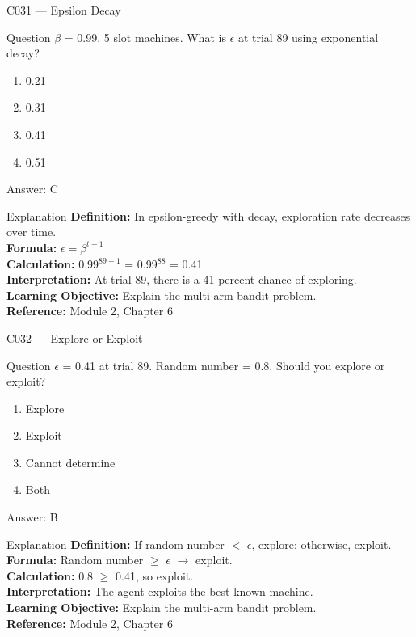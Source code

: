 \documentclass[aspectratio=169,8pt]{beamer}
\begin{document}
	\begin{frame}{C031 --- Epsilon Decay}
		\begin{block}{Question}
			$\beta$ = 0.99, 5 slot machines. What is $\epsilon$ at trial 89 using exponential decay?
			\begin{enumerate}
				\item 0.21
				\item 0.31
				\item 0.41
				\item 0.51
			\end{enumerate}
		\end{block}
		\begin{exampleblock}{Answer: C}\end{exampleblock}
		\begin{block}{Explanation}
			\textbf{Definition:} In epsilon-greedy with decay, exploration rate decreases over time.\\
			\textbf{Formula:} $\epsilon = \beta^{t-1}$\\
			\textbf{Calculation:} 0.99$^{89-1}$ = 0.99$^{88}$ = 0.41\\
			\textbf{Interpretation:} At trial 89, there is a 41 percent chance of exploring.\\
			\textbf{Learning Objective:} Explain the multi-arm bandit problem.\\
			\textbf{Reference:} Module 2, Chapter 6
		\end{block}
	\end{frame}
	
	\begin{frame}{C032 --- Explore or Exploit}
		\begin{block}{Question}
			$\epsilon$ = 0.41 at trial 89. Random number = 0.8. Should you explore or exploit?
			\begin{enumerate}
				\item Explore
				\item Exploit
				\item Cannot determine
				\item Both
			\end{enumerate}
		\end{block}
		\begin{exampleblock}{Answer: B}\end{exampleblock}
		\begin{block}{Explanation}
			\textbf{Definition:} If random number $<$ $\epsilon$, explore; otherwise, exploit.\\
			\textbf{Formula:} Random number $\geq$ $\epsilon$ $\rightarrow$ exploit.\\
			\textbf{Calculation:} 0.8 $\geq$ 0.41, so exploit.\\
			\textbf{Interpretation:} The agent exploits the best-known machine.\\
			\textbf{Learning Objective:} Explain the multi-arm bandit problem.\\
			\textbf{Reference:} Module 2, Chapter 6
		\end{block}
	\end{frame}
	
\end{document}
